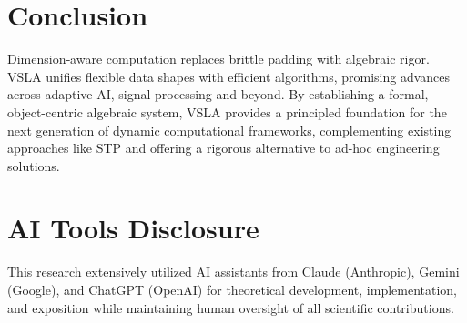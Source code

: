 \section{Conclusion}
Dimension‑aware computation replaces brittle padding with algebraic rigor.  VSLA unifies flexible data shapes with efficient algorithms, promising advances across adaptive AI, signal processing and beyond. By establishing a formal, object-centric algebraic system, VSLA provides a principled foundation for the next generation of dynamic computational frameworks, complementing existing approaches like STP and offering a rigorous alternative to ad-hoc engineering solutions.

\section*{AI Tools Disclosure}

This research extensively utilized AI assistants from Claude (Anthropic), Gemini (Google), and ChatGPT (OpenAI) for theoretical development, implementation, and exposition while maintaining human oversight of all scientific contributions.
